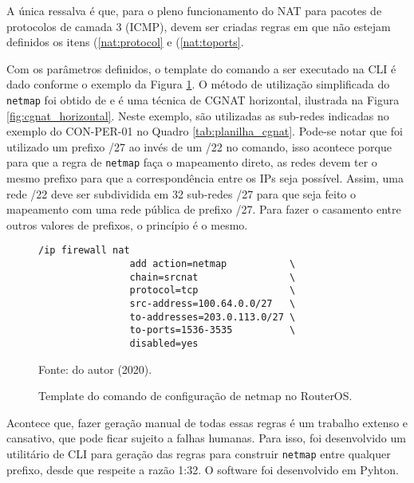     A única ressalva é que, para o pleno funcionamento do NAT para pacotes de protocolos de camada 3 (ICMP), devem ser criadas regras em que não estejam definidos os itens (\ref{nat:protocol} e (\ref{nat:toports}.

    Com os parâmetros definidos, o template do comando a ser executado na CLI é dado conforme o exemplo da Figura \ref{fig:netmap_cli}. O método de utilização simplificada do {\tt netmap} foi obtido de \cite{maia2018} e é uma técnica de CGNAT horizontal, ilustrada na Figura \ref{fig:cgnat_horizontal}. Neste exemplo, são utilizadas as sub-redes indicadas no exemplo do CON-PER-01 no Quadro \ref{tab:planilha_cgnat}. Pode-se notar que foi utilizado um prefixo /27 ao invés de um /22 no comando, isso acontece porque para que a regra de {\tt netmap} faça o mapeamento direto, as redes devem ter o mesmo prefixo para que a correspondência entre os IPs seja possível. Assim, uma rede /22 deve ser subdividida em 32 sub-redes /27 para que seja feito o mapeamento com uma rede pública de prefixo /27. Para fazer o casamento entre outros valores de prefixos, o princípio é o mesmo.

    \begin{figure}[!htb]
        \centering
        \caption{Template do comando de configuração de netmap no RouterOS.} 
        \label{fig:netmap_cli}
        
        \begin{Verbatim}[fontsize=\small]
            /ip firewall nat 
                add action=netmap           \
                chain=srcnat                \
                protocol=tcp                \
                src-address=100.64.0.0/27   \
                to-addresses=203.0.113.0/27 \
                to-ports=1536-3535          \
                disabled=yes
        \end{Verbatim} 

        {\small Fonte: do autor (2020).} 
    \end{figure}

    
    
    Acontece que, fazer geração manual de todas essas regras é um trabalho extenso e cansativo, que pode ficar sujeito a falhas humanas. Para isso, foi desenvolvido um utilitário de CLI para geração das regras para construir {\tt netmap} entre qualquer prefixo, desde que respeite a razão 1:32. O software foi desenvolvido em Pyhton.%

